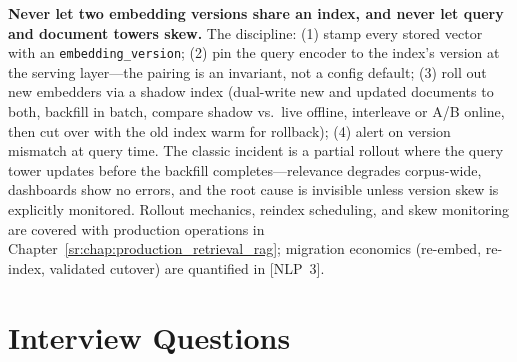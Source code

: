 \begin{warningbox}
\textbf{Never let two embedding versions share an index, and never let query and document towers skew.} The discipline: (1) stamp every stored vector with an \texttt{embedding\_version}; (2) pin the query encoder to the index's version at the serving layer---the pairing is an invariant, not a config default; (3) roll out new embedders via a shadow index (dual-write new and updated documents to both, backfill in batch, compare shadow vs.\ live offline, interleave or A/B online, then cut over with the old index warm for rollback); (4) alert on version mismatch at query time. The classic incident is a partial rollout where the query tower updates before the backfill completes---relevance degrades corpus-wide, dashboards show no errors, and the root cause is invisible unless version skew is explicitly monitored. Rollout mechanics, reindex scheduling, and skew monitoring are covered with production operations in Chapter~\ref{sr:chap:production_retrieval_rag}; migration economics (re-embed, re-index, validated cutover) are quantified in [NLP~3].
\end{warningbox}

\section{Interview Questions}
\label{sr:sec:neural_retrieval_interview}


